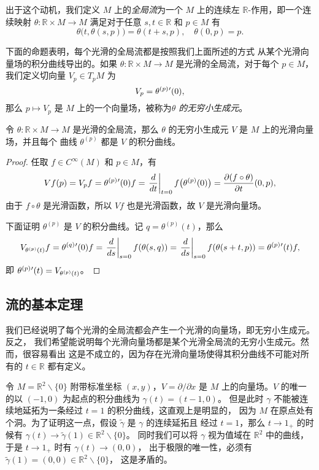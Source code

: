 出于这个动机，我们定义 $M$ 上的\emph{全局流}为一个 $M$
上的连续左 $\mathbb{R}$-作用，即一个连续映射 $\theta:\mathbb{R}\times M\to M$
满足对于任意 $s,t\in \mathbb{R}$ 和 $p\in M$ 有
\begin{equation}
  \theta\bigl(t,\theta(s,p)\bigr)=\theta(t+s,p),\quad
  \theta(0,p)=p.
\end{equation}

下面的命题表明，每个光滑的全局流都是按照我们上面所述的方式
从某个光滑向量场的积分曲线导出的。如果 $\theta:\mathbb{R}\times M\to M$
是光滑的全局流，对于每个 $p\in M$，我们定义切向量 $V_p\in T_pM$ 为
\[
  V_p=\smash{\theta^{(p)}}'(0),
\]
那么 $p\mapsto V_p$ 是 $M$ 上的一个向量场，被称为\emph{$\theta$ 的无穷小生成元}。

\begin{proposition}\label{prop:infinite generator}
  令 $\theta:\mathbb{R}\times M\to M$ 是光滑的全局流，那么
  $\theta$ 的无穷小生成元 $V$ 是 $M$ 上的光滑向量场，并且每个
  曲线 $\theta^{(p)}$ 都是 $V$ 的积分曲线。
\end{proposition}
\begin{proof}
  任取 $f\in C^\infty(M)$ 和 $p\in M$，有
  \[
    Vf(p)=V_pf=  \smash{\theta^{(p)}}'(0)f=
    \left.\frac{d}{dt}\right|_{t=0}f\bigl(\theta^{(p)}(0)\bigr)
    =\frac{\partial (f\circ\theta)}{\partial t}(0,p),
  \]
  由于 $f\circ\theta$ 是光滑函数，所以 $Vf$ 也是光滑函数，故
  $V$ 是光滑向量场。

  下面证明 $\theta^{(p)}$ 是 $V$ 的积分曲线。记 $q=\theta^{(p)}(t)$，那么
  \[
    V_{\theta^{(p)}(t)}f=\smash{\theta^{(q)}}'(0)f
    =\left.\frac{d}{ds}\right|_{s=0}f(\theta(s,q))
    =\left.\frac{d}{ds}\right|_{s=0}f(\theta(s+t,p))
    =\smash{\theta^{(p)}}'(t)f,
  \]
  即 $\smash{\theta^{(p)}}'(t)=V_{\theta^{(p)}(t)}$。
\end{proof}

\subsection{流的基本定理}

我们已经说明了每个光滑的全局流都会产生一个光滑的向量场，即无穷小生成元。反之，
我们希望能说明每个光滑向量场都是某个光滑全局流的无穷小生成元。然而，很容易看出
这是不成立的，因为存在光滑向量场使得其积分曲线不可能对所有的 $t\in \mathbb{R}$
都有定义。

\begin{example}
  令 $M=\mathbb{R}^2 \smallsetminus\{0\}$ 附带标准坐标 $(x,y)$，$V=\partial/\partial x$ 是 $M$
  上的向量场。$V$ 的唯一的以 $(-1,0)$ 为起点的积分曲线为 $\gamma(t)=(t-1,0)$。
  但是此时 $\gamma$ 不能被连续地延拓为一条经过 $t=1$ 的积分曲线，这直观上是明显的，
  因为 $M$ 在原点处有个洞。为了证明这一点，假设 $\tilde\gamma$ 是 $\gamma$ 的连续延拓且
  经过 $t=1$，那么 $t\to 1_+$ 的时候有 $\gamma(t)\to\tilde{\gamma}(1)\in \mathbb{R}^2 \smallsetminus\{0\}$。
  同时我们可以将 $\gamma$ 视为值域在 $\mathbb{R}^2$ 中的曲线，于是 $t\to 1_+$ 时有 $\gamma(t)\to (0,0)$，
  出于极限的唯一性，必须有 $\tilde{\gamma}(1)=(0,0)\in \mathbb{R}^2 \smallsetminus\{0\}$，
  这是矛盾的。
\end{example}

